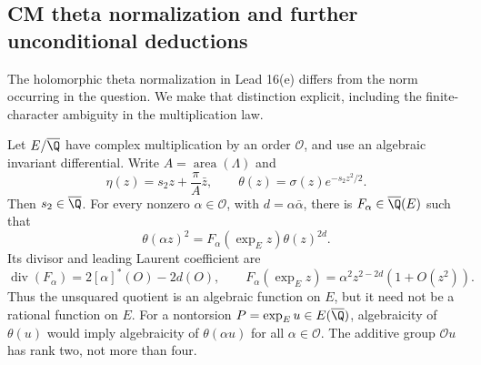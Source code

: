 \subsection{CM theta normalization and further unconditional deductions}

The holomorphic theta normalization in Lead 16(e) differs from the
norm occurring in the question. We make that distinction explicit,
including the finite-character ambiguity in the multiplication law.

\begin{statement}
Let $E/\overline{\Q}$ have complex multiplication by an order
$\mathcal O$, and use an algebraic invariant differential. Write
$A=\operatorname{area}(\Lambda)$ and
\[
 \eta(z)=s_2z+\frac{\pi}{A}\bar z,\qquad
 \theta(z)=\sigma(z)e^{-s_2z^2/2}.
\]
Then $s_2\in\overline{\Q}$. For every nonzero
$\alpha\in\mathcal O$, with $d=\alpha\bar\alpha$, there is
$F_\alpha\in\overline{\Q}(E)$ such that
\begin{equation}\label{eq:ct-CMmult}
 \theta(\alpha z)^2=F_\alpha(\exp_E z)\theta(z)^{2d}.
\end{equation}
Its divisor and leading Laurent coefficient are
\[
 \operatorname{div}(F_\alpha)=2[\alpha]^*(O)-2d(O),\qquad
 F_\alpha(\exp_Ez)=\alpha^2z^{2-2d}(1+O(z^2)).
\]
Thus the unsquared quotient is an algebraic function on $E$, but
it need not be a rational function on $E$. For a nontorsion
$P=\exp_Eu\in E(\overline{\Q})$, algebraicity of $\theta(u)$
would imply algebraicity of $\theta(\alpha u)$ for all
$\alpha\in\mathcal O$. The additive group $\mathcal O u$ has
rank two, not more than four.
\end{statement}
